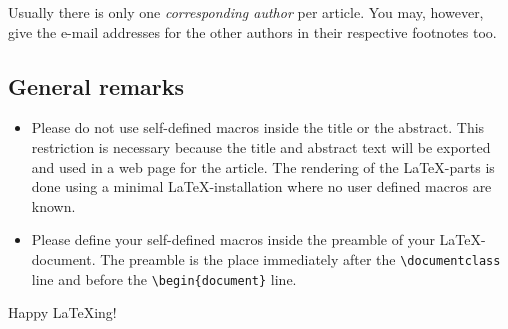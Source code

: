 \documentclass{article}
\begin{document}
Usually there is  only one \textit{corresponding author} per article. You may, however,
give the e-mail addresses for the other authors in their respective footnotes too.

\subsection{General remarks}

\begin{itemize}

\item Please do not use self-defined macros inside the title
  or the abstract. This restriction is necessary because the title and
  abstract text will be exported and used in a web page for the article. The
  rendering of the \LaTeX-parts is done using a minimal \LaTeX-installation
  where no user defined macros are known.

\item Please define your self-defined macros inside the preamble of your
  \LaTeX-document. The preamble is the place immediately after the
  \verb+\documentclass+ line and before the \verb+\begin{document}+ 
 line. 

\end{itemize}

Happy LaTeXing!
\end{document}
